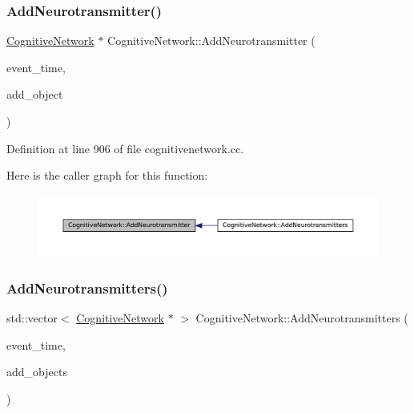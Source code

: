 \subsubsection{\texorpdfstring{Add\+Neurotransmitter()}{AddNeurotransmitter()}}
{\footnotesize\ttfamily \mbox{\hyperlink{class_cognitive_network}{Cognitive\+Network}} $\ast$ Cognitive\+Network\+::\+Add\+Neurotransmitter (\begin{DoxyParamCaption}\item[{std\+::chrono\+::time\+\_\+point$<$ \mbox{\hyperlink{universe_8h_a0ef8d951d1ca5ab3cfaf7ab4c7a6fd80}{Clock}} $>$}]{event\+\_\+time,  }\item[{\mbox{\hyperlink{class_cognitive_network}{Cognitive\+Network}} $\ast$}]{add\+\_\+object }\end{DoxyParamCaption})}



Definition at line 906 of file cognitivenetwork.\+cc.

Here is the caller graph for this function\+:\nopagebreak
\begin{figure}[H]
\begin{center}
\leavevmode
\includegraphics[width=350pt]{class_cognitive_network_ab80ffdc75ad4754463c356d36fb81ab4_icgraph}
\end{center}
\end{figure}
\mbox{\label{class_cognitive_network_a085f61ab94b71406a0a5e11d789ed69c}} 
\subsubsection{\texorpdfstring{Add\+Neurotransmitters()}{AddNeurotransmitters()}}
{\footnotesize\ttfamily std\+::vector$<$ \mbox{\hyperlink{class_cognitive_network}{Cognitive\+Network}} $\ast$ $>$ Cognitive\+Network\+::\+Add\+Neurotransmitters (\begin{DoxyParamCaption}\item[{std\+::chrono\+::time\+\_\+point$<$ \mbox{\hyperlink{universe_8h_a0ef8d951d1ca5ab3cfaf7ab4c7a6fd80}{Clock}} $>$}]{event\+\_\+time,  }\item[{std\+::vector$<$ \mbox{\hyperlink{class_cognitive_network}{Cognitive\+Network}} $\ast$$>$}]{add\+\_\+objects }\end{DoxyParamCaption})}



